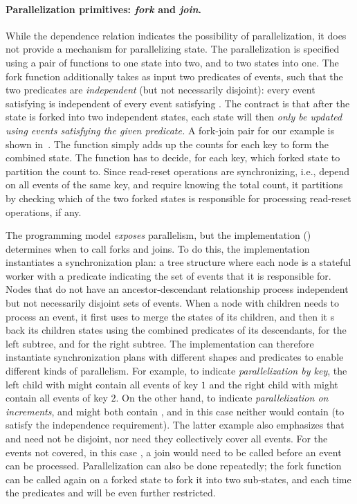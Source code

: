 \paragraph{Parallelization primitives: \emph{fork} and \emph{join}.}
\label{dgs:p:fork-join}
While the dependence relation indicates the possibility of
parallelization, it does not provide a mechanism for parallelizing
state.  The parallelization is specified using a pair of functions to 
one state into two, and to  two states into one.
The
fork function additionally takes as input two predicates of events,
such that the two predicates are \emph{independent} (but not necessarily disjoint):
every event satisfying  is independent of every event satisfying .
The
contract is that after the state is forked into two independent
states, each state will then \emph{only be updated using events satisfying
the given predicate.}
A fork-join pair for our example
is shown in~.
The  function simply adds up the counts for each key to form the combined
state. The  function has to decide, for each key, which forked state
to partition the count to.
Since read-reset operations  are synchronizing,
  i.e., depend on all events of the same key,
  and require knowing the total count,
it partitions by checking
which of the two forked states is responsible for processing read-reset
operations, if any.

The programming model \emph{exposes} parallelism,
but the implementation () determines when to call forks and
joins.
To do this, the implementation instantiates a synchronization plan:
  a tree structure where each node is a stateful worker with a predicate indicating the set of events that it is responsible for.
%
Nodes that do not have an ancestor-descendant relationship process independent but not necessarily disjoint sets of events.
%
When a node with children needs to process an event,
  it first uses  to merge the states of its children,
  and then it s back its children states using the combined predicates of its descendants,  for the left subtree, and  for the right subtree.
%
The implementation can therefore instantiate synchronization plans with different shapes and predicates to enable different kinds of parallelism.
For example, to indicate
\emph{parallelization by key},
the left child with  might contain all events of key $1$
and the right child with  might contain all events of key $2$.
On the other hand, to indicate \emph{parallelization on increments},
 and  might both contain , and in this case neither would contain  (to satisfy the independence requirement).
The latter example also emphasizes that  and  need not be disjoint, nor need they collectively cover all events.
For the events not covered, in this case , a join would need to be called before an  event can be processed.
Parallelization can also be done repeatedly;
the fork function can be called again on a forked state to fork it into two sub-states, and each time the predicates  and  will be even further restricted.


